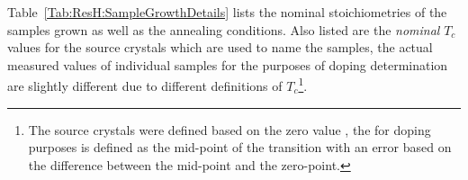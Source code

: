 Table~\ref{Tab:ResH:SampleGrowthDetails} lists the nominal stoichiometries of the samples grown as well as the annealing conditions. Also listed are the \emph{nominal} $T_c$ values for the source crystals which are used to name the samples, the actual measured \Tc values of individual samples for the purposes of doping determination are slightly different due to different definitions of $T_c$\footnote{The source crystals were defined based on the zero value \Tc, the \Tc for doping purposes is defined as the mid-point of the transition with an error based on the difference between the mid-point and the zero-point.}.

